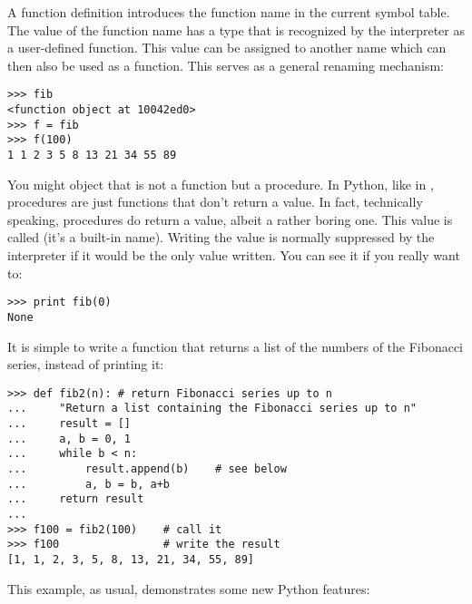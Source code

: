 \documentclass{manual}
\begin{document}
A function definition introduces the function name in the current
symbol table.  The value of the function name
has a type that is recognized by the interpreter as a user-defined
function.  This value can be assigned to another name which can then
also be used as a function.  This serves as a general renaming
mechanism:

\begin{verbatim}
>>> fib
<function object at 10042ed0>
>>> f = fib
>>> f(100)
1 1 2 3 5 8 13 21 34 55 89
\end{verbatim}

You might object that  is not a function but a procedure.  In
Python, like in \C{}, procedures are just functions that don't return a
value.  In fact, technically speaking, procedures do return a value,
albeit a rather boring one.  This value is called  (it's a
built-in name).  Writing the value  is normally suppressed by
the interpreter if it would be the only value written.  You can see it
if you really want to:

\begin{verbatim}
>>> print fib(0)
None
\end{verbatim}

It is simple to write a function that returns a list of the numbers of
the Fibonacci series, instead of printing it:

\begin{verbatim}
>>> def fib2(n): # return Fibonacci series up to n
...     "Return a list containing the Fibonacci series up to n"
...     result = []
...     a, b = 0, 1
...     while b < n:
...         result.append(b)    # see below
...         a, b = b, a+b
...     return result
... 
>>> f100 = fib2(100)    # call it
>>> f100                # write the result
[1, 1, 2, 3, 5, 8, 13, 21, 34, 55, 89]
\end{verbatim}
%
This example, as usual, demonstrates some new Python features:
\end{document}
